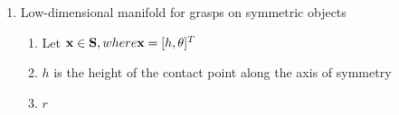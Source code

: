 \documentclass{aamas2015}
\begin{document}
\begin{enumerate}
% 		
% 			
% 
% 		
% 		
% 		
	
	\item Low-dimensional manifold for grasps on symmetric objects	
	\begin{enumerate}
	\item Let $\textbf{x} \in \textbf{S}, where \textbf{x} = [h, \theta]^T$
	\item $h$ is the height of the contact point along the axis of symmetry
	\item $r$
	\end{enumerate}

\end{enumerate}
\end{document}
